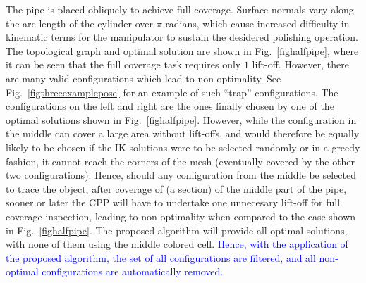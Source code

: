 \documentclass[journal]{IEEEtran}
\begin{document}
The pipe is placed obliquely to achieve full coverage. Surface normals vary along the arc length of the cylinder 
over $\pi$ radians, which cause increased difficulty in kinematic terms for the manipulator 
to sustain the desidered polishing operation. 
The topological graph and optimal solution are shown in Fig.~\ref{fighalfpipe}, where it can be seen that the full coverage task requires only $1$ lift-off. 
However, there are many valid configurations which lead to non-optimality. 
See Fig.~\ref{figthreeexamplepose} for an example of such ``trap'' configurations. 
The configurations on the left and right are the ones finally chosen by one of the optimal solutions shown in Fig.~\ref{fighalfpipe}. 
However, while the configuration in the middle can cover a large area without lift-offs, and would therefore be equally likely to be chosen if the IK solutions were to be selected randomly or in a greedy fashion, it cannot reach the corners of the mesh (eventually covered by the other two configurations). Hence, should any configuration from the middle be selected to trace 
the object, after coverage of (a section) of the middle part of the pipe, sooner or later the CPP will have to undertake one unnecesary lift-off for full coverage inspection, leading to non-optimality when compared to the case shown in Fig.~\ref{fighalfpipe}. The proposed algorithm will provide all optimal solutions, with none of them using the middle colored cell.
\textcolor{blue}{Hence, with the application of the proposed algorithm, the set of all configurations are filtered, and all non-optimal configurations are automatically removed. 
}
\end{document}
